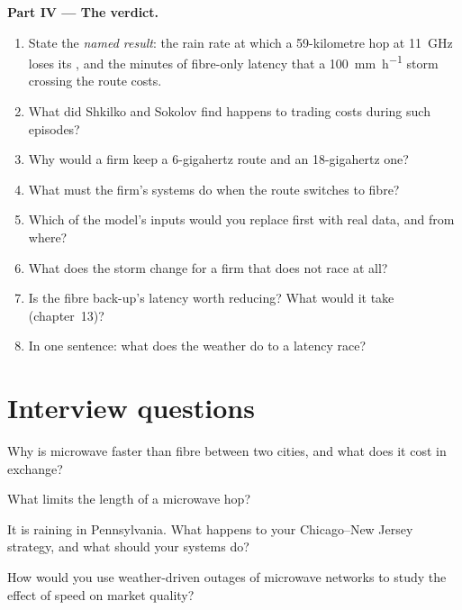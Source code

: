 \begin{problem}
\medskip\noindent\textbf{Part IV --- The verdict.}
\begin{enumerate}[resume]
\item State the \emph{named result}: the rain rate at which a 59-kilometre hop at \qty{11}{\giga\hertz} loses its , and the minutes of
  fibre-only latency that a \qty{100}{\milli\metre\per\hour} storm crossing the route costs.
\item What did Shkilko and Sokolov find happens to trading costs during such episodes?
\item Why would a firm keep a 6-gigahertz route and an 18-gigahertz one?
\item What must the firm's systems do when the route switches to fibre?
\item Which of the model's inputs would you replace first with real data, and from where?
\item What does the storm change for a firm that does not race at all?
\item Is the fibre back-up's latency worth reducing? What would it take (chapter~13)?
\item In one sentence: what does the weather do to a latency race?
\end{enumerate}
\end{problem}

\section{Interview questions}

\begin{interviewq}\label{iq:nw:long-haul-wireless:1}
Why is microwave faster than fibre between two cities, and what does it cost in exchange?
\end{interviewq}

\begin{interviewq}\label{iq:nw:long-haul-wireless:2}
What limits the length of a microwave hop?
\end{interviewq}

\begin{interviewq}\label{iq:nw:long-haul-wireless:3}
It is raining in Pennsylvania. What happens to your Chicago--New Jersey strategy, and what should your systems do?
\end{interviewq}

\begin{interviewq}\label{iq:nw:long-haul-wireless:4}
How would you use weather-driven outages of microwave networks to study the effect of speed on market quality?
\end{interviewq}

